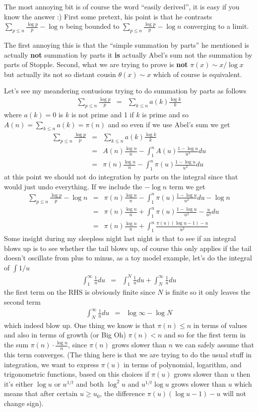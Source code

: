\documentclass[aps,preprint,preprintnumbers,nofootinbib,showpacs,prd]{revtex4-1}
\newcommand{\nbea}{\begin{eqnarray*}}
\newcommand{\neea}{\end{eqnarray*}}
\begin{document}
The most annoying bit is of course the word ``easily derived'', it is easy if you know the answer :) First some pretext, his point is that he contrasts $\sum_{p\le n}\frac{\log p}{p} - \log n$ being bounded  to $\sum_{p\le n}\frac{\log p}{p} - \log n$ converging to a limit.

The first annoying this is that the ``simple summation by parts'' he mentioned is actually {\bf not} summation by parts it {\bf is} actually Abel's sum not the summation by parts of Stopple. Second, what we are trying to prove is {\bf not} $\pi(x) \sim x/\log x$ but actually its not so distant cousin $\theta(x) \sim x$ which of course is equivalent.

Let's see my meandering contusions trying to do summation by parts as follows
%
\nbea
\sum_{p\le n}\frac{\log p}{p} & = & \sum_{k\le n}a(k)\frac{\log k}{k}
\neea
%
where $a(k) = 0$ is $k$ is not prime and 1 if $k$ is prime and so $A(n) = \sum_{k\le n} a(k) = \pi(n)$ and so even if we use Abel's sum we get
%
\nbea
\sum_{p\le n}\frac{\log p}{p} & = & \sum_{k\le n}a(k)\frac{\log k}{k} \\
& = & A(n)\frac{\log n}{n} - \int_1^n A(u) \frac{1 - \log u}{u^2} du \\
& = & \pi(n)\frac{\log n}{n} - \int_1^n \pi(u) \frac{1 - \log u}{u^2} du
\neea
%
at this point we should not do integration by parts on the integral since that would just undo everything. If we include the $-\log n$ term we get
%
\nbea
\sum_{p\le n}\frac{\log p}{p} - \log n & = & \pi(n)\frac{\log n}{n} - \int_1^n \pi(u) \frac{1 - \log u}{u^2} du - \log n \\
& = & \pi(n)\frac{\log n}{n} + \int_1^n \pi(u) \frac{1 - \log u}{u^2} - \frac{u}{u^2} du \\
& = & \pi(n)\frac{\log n}{n} + \int_1^n \frac{\pi(u)(\log u - 1) - u}{u^2}
\neea
%
Some insight during my sleepless night last night is that to see if an integral blows up is to see whether the tail blows up, of course this only applies if the tail doesn't oscillate from plus to minus, as a toy model example, let's do the integral of $\int 1/u$
%
\nbea
\int_1^\infty \frac{1}{u} du & = & \int_1^N \frac{1}{u} du + \int_N^\infty \frac{1}{u} du
\neea
%
the first term on the RHS is obviously finite since $N$ is finite so it only leaves the second term
%
\nbea
\int_N^\infty \frac{1}{u} du & = & \log\infty - \log N
\neea
%
which indeed blow up. One thing we know is that $\pi(n)\le n$ in terms of values and also in terms of growth (or Big Oh) $\pi(n) < n$ and so for the first term in the sum $\pi(n)\cdot \frac{\log n}{n}$, since $\pi(n)$ grows slower than $n$ we can safely assume that this term converges. (The thing here is that we are trying to do the usual stuff in integration, we want to express $\pi(u)$ in terms of polynomial, logarithm, and trigonometric functions, based on this choices if $\pi(u)$ grows slower than $u$ then it's either $\log u$ or $u^{1/t}$ and both $\log^2 u$ and $u^{1/t}\log u$ grows slower than $u$ which means that after certain $u\ge u_0$, the difference $\pi(u)(\log u-1) - u$ will not change sign).
\end{document}
